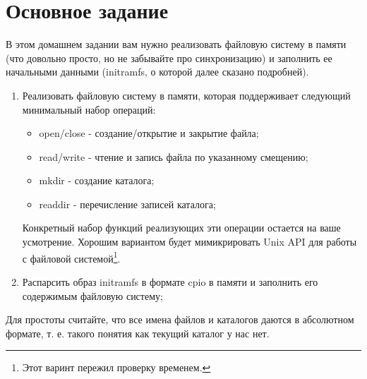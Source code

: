 \section{Основное задание}

В этом домашнем задании вам нужно реализовать файловую систему в памяти (что
довольно просто, но не забывайте про синхронизацию) и заполнить ее начальными
данными (initramfs, о которой далее сказано подробней).

\begin{enumerate}
  \item Реализовать файловую систему в памяти, которая поддерживает следующий
        минимальный набор операций:
        \begin{itemize}
          \item open/close - создание/открытие и закрытие файла;
          \item read/write - чтение и запись файла по указанному смещению;
          \item mkdir - создание каталога;
          \item readdir - перечисление записей каталога;
        \end{itemize}
        Конкретный набор функций реализующих эти операции остается на ваше
        усмотрение. Хорошим вариантом будет мимикрировать Unix API для работы
        с файловой системой\footnote{Этот варинт пережил проверку временем.}.
  \item Распарсить образ initramfs в формате cpio в памяти и заполнить его
        содержимым файловую систему;
\end{enumerate}

Для простоты считайте, что все имена файлов и каталогов даются в абсолютном
формате, т. е. такого понятия как текущий каталог у нас нет.

